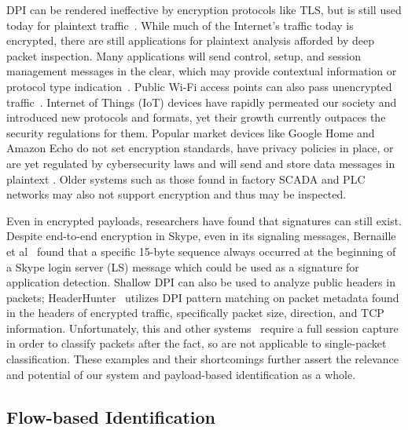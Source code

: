 DPI can be rendered ineffective by encryption protocols like TLS, but is still used today for plaintext traffic~\cite{ZHAO202122}. While much of the Internet's traffic today is encrypted, there are still applications for plaintext analysis afforded by deep packet inspection. Many applications will send control, setup, and session management messages in the clear, which may provide contextual information or protocol type indication~\cite{Hasanzadeh, Ogudo, Zhang}. Public Wi-Fi access points can also pass unencrypted traffic~\cite{Maimon}. Internet of Things (IoT) devices have rapidly permeated our society and introduced new protocols and formats, yet their growth currently outpaces the security regulations for them. Popular market devices like Google Home and Amazon Echo do not set encryption standards, have privacy policies in place, or are yet regulated by cybersecurity laws and will send and store data messages in plaintext \cite{wood2017cleartext, Capellupo, WangYong}. Older systems such as those found in factory SCADA and PLC networks may also not support encryption \cite{Malaka} and thus may be inspected.

Even in encrypted payloads, researchers have found that signatures can still exist. Despite end-to-end encryption in Skype, even in its signaling messages, Bernaille et al~\cite{Bernaille} found that a specific 15-byte sequence always occurred at the beginning of a Skype login server (LS) message which could be used as a signature for application detection. Shallow DPI can also be used to analyze public headers in packets; HeaderHunter~\cite{HeaderHunter} utilizes DPI pattern matching on packet metadata found in the headers of encrypted traffic, specifically packet size, direction, and TCP information. Unfortunately, this and other systems~\cite{Moore2013DiscriminatorsFU, Roughan} require a full session capture in order to classify packets after the fact, so are not applicable to single-packet classification. These examples and their shortcomings further assert the relevance and potential of our system and payload-based identification as a whole.

\subsection{Flow-based Identification}

